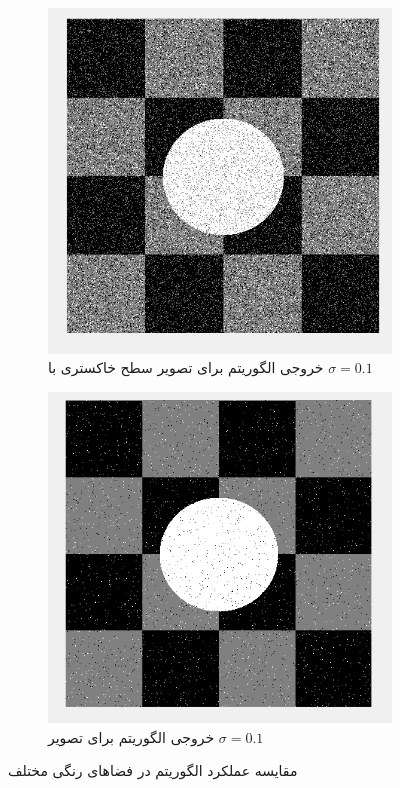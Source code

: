 \documentclass[11.5pt,a4paper]{article}
\begin{document}
\begin{figure}[h]
\begin{subfigure}{0.4\textwidth}
	\includegraphics[scale=0.3]{Imgs/MRF_S1_BetaV_Res.png}
	\caption{خروجی الگوریتم برای تصویر سطح خاکستری با $\sigma=0.1$}
	\end{subfigure}
	\begin{subfigure}{0.4\textwidth}
	\includegraphics[scale=0.3]{Imgs/MRF_S01_Res.png}
	\caption{خروجی الگوریتم برای تصویر  $\sigma=0.1$}
	\end{subfigure}	
\caption{مقایسه عملکرد الگوریتم در فضاهای رنگی مختلف}
\label{fig:HSV}
\end{figure}
\end{document}
